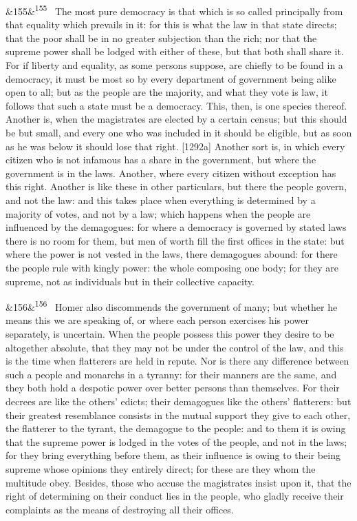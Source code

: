 \documentclass[12pt]{article}
\newcommand{\para}[1][]{\par\noindent\ifx&#1&\else\textsuperscript{\footnotesize #1}~\fi}
\begin{document}
\para[155] The most pure democracy is that which is so called principally from that equality which prevails in it: for this is what the law in that state directs; that the poor shall be in no greater subjection than the rich; nor that the supreme power shall be lodged with either of these, but that both shall share it. For if liberty and equality, as some persons suppose, are chiefly to be found in a democracy, it must be most so by every department of government being alike open to all; but as the people are the majority, and what they vote is law, it follows that such a state must be a democracy. This, then, is one species thereof. Another is, when the magistrates are elected by a certain census; but this should be but small, and every one who was included in it should be eligible, but as soon as he was below it should lose that right. [1292a] Another sort is, in which every citizen who is not infamous has a share in the government, but where the government is in the laws. Another, where every citizen without exception has this right. Another is like these in other particulars, but there the people govern, and not the law: and this takes place when everything is determined by a majority of votes, and not by a law; which happens when the people are influenced by the demagogues: for where a democracy is governed by stated laws there is no room for them, but men of worth fill the first offices in the state: but where the power is not vested in the laws, there demagogues abound: for there the people rule with kingly power: the whole composing one body; for they are supreme, not as individuals but in their collective capacity.

\para[156] Homer also discommends the government of many; but whether he means this we are speaking of, or where each person exercises his power separately, is uncertain. When the people possess this power they desire to be altogether absolute, that they may not be under the control of the law, and this is the time when flatterers are held in repute. Nor is there any difference between such a people and monarchs in a tyranny: for their manners are the same, and they both hold a despotic power over better persons than themselves. For their decrees are like the others' edicts; their demagogues like the others' flatterers: but their greatest resemblance consists in the mutual support they give to each other, the flatterer to the tyrant, the demagogue to the people: and to them it is owing that the supreme power is lodged in the votes of the people, and not in the laws; for they bring everything before them, as their influence is owing to their being supreme whose opinions they entirely direct; for these are they whom the multitude obey. Besides, those who accuse the magistrates insist upon it, that the right of determining on their conduct lies in the people, who gladly receive their complaints as the means of destroying all their offices.
\end{document}

